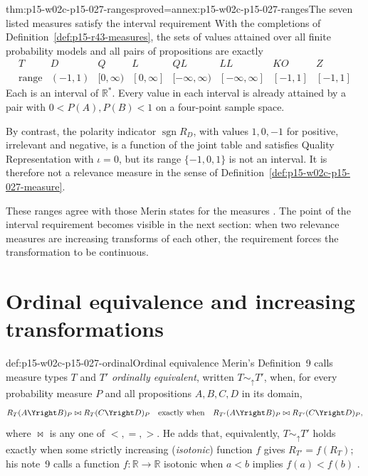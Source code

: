 \begin{hbtheorem}{thm:p15-w02c-p15-027-ranges}{proved=annex:p15-w02c-p15-027-ranges}{The seven listed measures satisfy the interval requirement}
With the completions of Definition~\ref{def:p15-r43-measures}, the sets
of values attained over all finite probability models and all pairs of
propositions are exactly
\[
\begin{array}{c|ccccccc}
T & D & Q & L & QL & LL & KO & Z\\\hline
\text{range} & (-1,1) & [0,\infty) & [0,\infty] & [-\infty,\infty)
  & [-\infty,\infty] & [-1,1] & [-1,1]
\end{array}
\]
Each is an interval of \(\mathbb R^*\). Every value in each interval is
already attained by a pair with \(0<P(A),P(B)<1\) on a four-point
sample space.

By contrast, the polarity indicator \(\operatorname{sgn}R_D\), with
values \(1,0,-1\) for positive, irrelevant and negative, is a function
of the joint table and satisfies Quality Representation with
\(\iota=0\), but its range \(\{-1,0,1\}\) is not an interval. It is
therefore not a relevance measure in the sense of
Definition~\ref{def:p15-w02c-p15-027-measure}.
\end{hbtheorem}

These ranges agree with those Merin states for the measures
\cite[p.~270]{Merin2021Relevance}. The point of the interval
requirement becomes visible in the next section: when two relevance
measures are increasing transforms of each other, the requirement forces
the transformation to be continuous.

\section{Ordinal equivalence and increasing transformations}
\label{sec:p15-w02c-p15-027-ordinal}

\begin{hbdefinition}{def:p15-w02c-p15-027-ordinal}{Ordinal equivalence}
Merin's Definition~9 calls measure types \(T\) and \(T'\)
\emph{ordinally equivalent}, written \(T\sim_{\uparrow}T'\), when, for
every probability measure \(P\) and all propositions \(A,B,C,D\) in its
domain,
\[
 R_T(A\Yright B)_P\bowtie R_T(C\Yright D)_P
 \quad\text{exactly when}\quad
 R_{T'}(A\Yright B)_P\bowtie R_{T'}(C\Yright D)_P,
\]
where \(\bowtie\) is any one of \(<,=,>\). He adds that, equivalently,
\(T\sim_{\uparrow}T'\) holds exactly when some strictly increasing
(\emph{isotonic}) function \(f\) gives \(R_{T'}=f(R_T)\); his note~9
calls a function \(f:\mathbb R\to\mathbb R\) isotonic when \(a<b\)
implies \(f(a)<f(b)\) \cite[p.~270 and p.~274, n.~9]{Merin2021Relevance}.
\end{hbdefinition}

